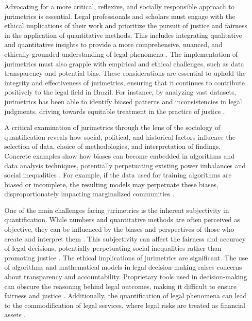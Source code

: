 Advocating for a more critical, reflexive, and socially responsible approach to jurimetrics is essential. Legal professionals and scholars must engage with the ethical implications of their work and prioritize the pursuit of justice and fairness in the application of quantitative methods. This includes integrating qualitative and quantitative insights to provide a more comprehensive, nuanced, and ethically grounded understanding of legal phenomena \cite{pereira2021}. The implementation of jurimetrics must also grapple with empirical and ethical challenges, such as data transparency and potential bias. These considerations are essential to uphold the integrity and effectiveness of jurimetrics, ensuring that it continues to contribute positively to the legal field in Brazil. For instance, by analyzing vast datasets, jurimetrics has been able to identify biased patterns and inconsistencies in legal judgments, driving towards equitable treatment in the practice of justice \cite{10.1007/s11186-021-09453-1,international2015}.

A critical examination of jurimetrics through the lens of the sociology of quantification reveals how social, political, and historical factors influence the selection of data, choice of methodologies, and interpretation of findings. Concrete examples show how biases can become embedded in algorithms and data analysis techniques, potentially perpetuating existing power imbalances and social inequalities \cite{10.1007/s11186-021-09453-1,international2015}. For example, if the data used for training algorithms are biased or incomplete, the resulting models may perpetuate these biases, disproportionately impacting marginalized communities \cite{10.5040/9781350220645,10.1080/07329113.2015.1046739}.

One of the main challenges facing jurimetrics is the inherent subjectivity in quantification. While numbers and quantitative methods are often perceived as objective, they can be influenced by the biases and perspectives of those who create and interpret them \cite{101111lsi12334}. This subjectivity can affect the fairness and accuracy of legal decisions, potentially perpetuating social inequalities rather than promoting justice \cite{101111lsi12334}. The ethical implications of jurimetrics are significant. The use of algorithms and mathematical models in legal decision-making raises concerns about transparency and accountability. Proprietary tools used in decision-making can obscure the reasoning behind legal outcomes, making it difficult to ensure fairness and justice \cite{101057s4159902003965}. Additionally, the quantification of legal phenomena can lead to the commodification of legal services, where legal risks are treated as financial assets \cite{ribeiro2021quantification}.

